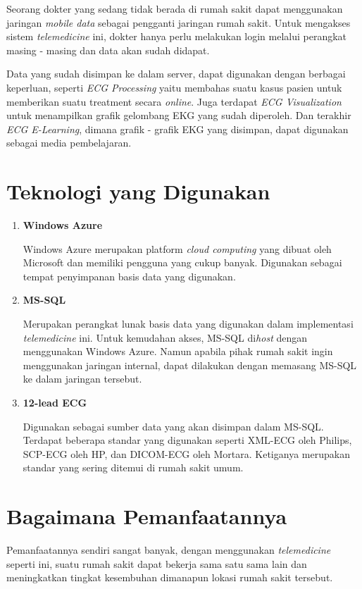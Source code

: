 \documentclass[12pt, a4paper]{article}
\begin{document}
Seorang dokter yang sedang tidak berada di rumah sakit dapat menggunakan jaringan \textit{mobile data} sebagai pengganti jaringan rumah sakit. Untuk mengakses sistem \textit{telemedicine} ini, dokter hanya perlu melakukan login melalui perangkat masing - masing dan data akan sudah didapat.

Data yang sudah disimpan ke dalam server, dapat digunakan dengan berbagai keperluan, seperti \textit{ECG Processing} yaitu membahas suatu kasus pasien untuk memberikan suatu treatment secara \textit{online}. Juga terdapat \textit{ECG Visualization} untuk menampilkan grafik gelombang EKG yang sudah diperoleh. Dan terakhir \textit{ECG E-Learning}, dimana grafik - grafik EKG yang disimpan, dapat digunakan sebagai media pembelajaran.

\section*{Teknologi yang Digunakan}

\begin{enumerate}
    \item \textbf{Windows Azure}

          Windows Azure merupakan platform \textit{cloud computing} yang dibuat oleh Microsoft dan memiliki pengguna yang cukup banyak. Digunakan sebagai tempat penyimpanan basis data yang digunakan.

    \item \textbf{MS-SQL}

          Merupakan perangkat lunak basis data yang digunakan dalam implementasi \textit{telemedicine} ini. Untuk kemudahan akses, MS-SQL di\textit{host} dengan menggunakan Windows Azure. Namun apabila pihak rumah sakit ingin menggunakan jaringan internal, dapat dilakukan dengan memasang MS-SQL ke dalam jaringan tersebut.

    \item \textbf{12-lead ECG}

          Digunakan sebagai sumber data yang akan disimpan dalam MS-SQL. Terdapat beberapa standar yang digunakan seperti XML-ECG oleh Philips, SCP-ECG oleh HP, dan DICOM-ECG oleh Mortara. Ketiganya merupakan standar yang sering ditemui di rumah sakit umum.

\end{enumerate}

\section*{Bagaimana Pemanfaatannya}
Pemanfaatannya sendiri sangat banyak, dengan menggunakan \textit{telemedicine} seperti ini, suatu rumah sakit dapat bekerja sama satu sama lain dan meningkatkan tingkat kesembuhan dimanapun lokasi rumah sakit tersebut.
\end{document}
